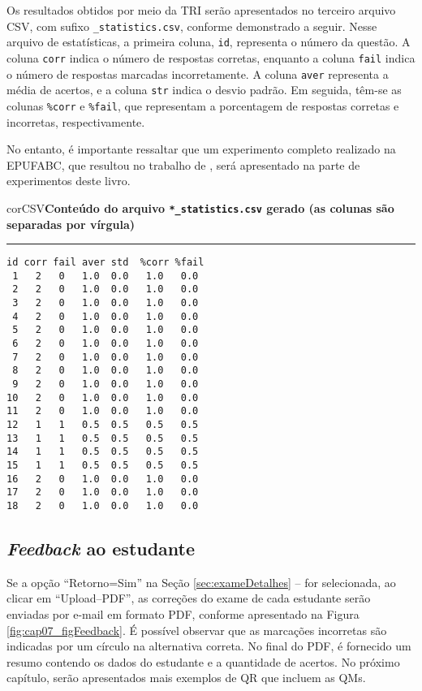 Os resultados obtidos por meio da TRI serão apresentados no terceiro arquivo CSV, com sufixo \verb|_statistics.csv|, conforme demonstrado a seguir. Nesse arquivo de estatísticas, a primeira coluna, \verb|id|, representa o número da questão. A coluna \verb|corr| indica o número de respostas corretas, enquanto a coluna \verb|fail| indica o número de respostas marcadas incorretamente. A coluna \verb|aver| representa a média de acertos, e a coluna \verb|str| indica o desvio padrão. Em seguida, têm-se as colunas \verb|%corr| e \verb|%fail|, que representam a porcentagem de respostas corretas e incorretas, respectivamente.

No entanto, é importante ressaltar que um experimento completo realizado na EPUFABC, que resultou no trabalho de , será apresentado na parte de experimentos deste livro.

\begin{myboxCode}{corCSV}{\textbf{Conteúdo do arquivo \texttt{*\_statistics.csv} gerado (as colunas são separadas por vírgula)}}\vspace{3mm}
\hrule
{\footnotesize
\begin{verbatim}
id corr fail aver std  %corr %fail
 1   2   0   1.0  0.0   1.0   0.0
 2   2   0   1.0  0.0   1.0   0.0
 3   2   0   1.0  0.0   1.0   0.0
 4   2   0   1.0  0.0   1.0   0.0
 5   2   0   1.0  0.0   1.0   0.0
 6   2   0   1.0  0.0   1.0   0.0
 7   2   0   1.0  0.0   1.0   0.0
 8   2   0   1.0  0.0   1.0   0.0
 9   2   0   1.0  0.0   1.0   0.0
10   2   0   1.0  0.0   1.0   0.0
11   2   0   1.0  0.0   1.0   0.0
12   1   1   0.5  0.5   0.5   0.5
13   1   1   0.5  0.5   0.5   0.5
14   1   1   0.5  0.5   0.5   0.5
15   1   1   0.5  0.5   0.5   0.5
16   2   0   1.0  0.0   1.0   0.0
17   2   0   1.0  0.0   1.0   0.0
18   2   0   1.0  0.0   1.0   0.0
\end{verbatim}
}
\end{myboxCode}

\subsection{\textit{Feedback} ao estudante}


Se a opção ``Retorno=Sim'' na Seção \ref{sec:exameDetalhes} --  for selecionada, ao clicar em ``Upload--PDF'', as correções do exame de cada estudante serão enviadas por e-mail em formato PDF, conforme apresentado na Figura \ref{fig:cap07_figFeedback}. É possível observar que as marcações incorretas são indicadas por um círculo na alternativa correta. No final do PDF, é fornecido um resumo contendo os dados do estudante e a quantidade de acertos. No próximo capítulo, serão apresentados mais exemplos de QR que incluem as QMs.

